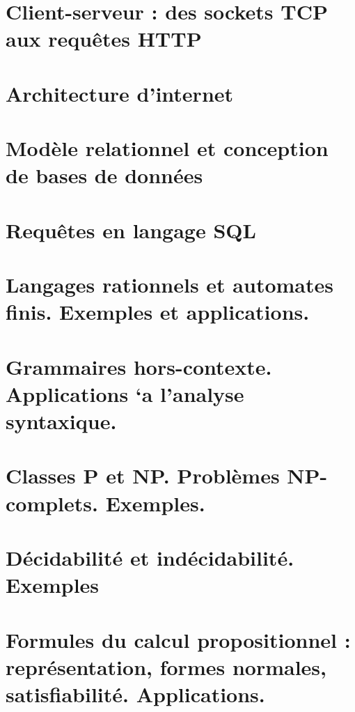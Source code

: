 \chapter{Client-serveur : des sockets TCP aux requêtes HTTP} \label{L25}


\chapter{Architecture d'internet} \label{L26}


\chapter{Modèle relationnel et conception de bases de données} \label{L27}


\chapter{Requêtes en langage SQL} \label{L28}


\chapter{Langages rationnels et automates finis. Exemples et applications.}\label{L29}


\chapter{Grammaires hors-contexte. Applications `a l’analyse syntaxique.}

\chapter{Classes P et NP. Problèmes NP-complets. Exemples.} \label{L31}


\chapter{Décidabilité et indécidabilité. Exemples} \label{L32}


\chapter{Formules du calcul propositionnel : représentation, formes normales, satisfiabilité. Applications.} \label{L33}


